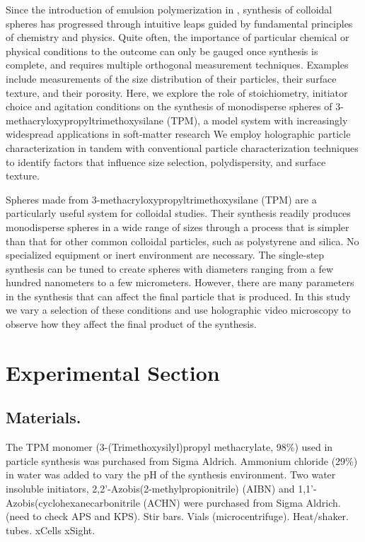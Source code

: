 
Since the introduction of emulsion polymerization in ,
synthesis of colloidal spheres has progressed through
intuitive leaps guided by fundamental principles of chemistry
and physics.  Quite often, the importance of particular chemical
or physical conditions to the outcome can only be gauged once
synthesis is complete, and requires multiple orthogonal measurement
techniques. Examples include measurements of the size distribution
of their particles, their surface texture, and their porosity.
Here, we explore the role of stoichiometry, initiator choice and
agitation conditions on the synthesis of
monodisperse spheres of
\num{3}-methacryloxypropyltrimethoxysilane (TPM),
a model system with increasingly widespread applications
in soft-matter research %
We employ holographic particle characterization
in tandem with conventional particle characterization
techniques
to identify factors that 
influence size selection, polydispersity, and surface texture.

Spheres made from  \num{3}-methacryloxypropyltrimethoxysilane (TPM) are a 
particularly useful system for colloidal studies. Their synthesis readily 
produces monodisperse spheres in a wide range of sizes through a process 
that is simpler than that for other common colloidal particles, such 
as polystyrene and silica. No specialized 
equipment or inert environment are necessary. 
The single-step synthesis can be tuned to create spheres
with diameters ranging from a few 
hundred nanometers to a few micrometers. However, there are many 
parameters in the synthesis that can affect the final particle that 
is produced. In this study we vary a selection of these conditions 
and use holographic video microscopy to observe how they affect the 
final product of the synthesis.

\section{Experimental Section}
\subsection{Materials.}
The TPM monomer (3-(Trimethoxysilyl)propyl methacrylate, 98\%) used in particle synthesis was purchased from Sigma Aldrich. Ammonium chloride (29\%) in water was added to vary the pH of the synthesis environment. Two water insoluble initiators, 2,2'-Azobis(2-methylpropionitrile) (AIBN) and 1,1'-Azobis(cyclohexanecarbonitrile (ACHN) were purchased from Sigma Aldrich. (need to check APS and KPS). 
Stir bars. Vials (microcentrifuge). Heat/shaker.
tubes. xCells xSight.

